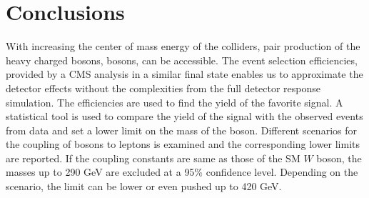 \section{Conclusions}\label{sec:conclusion} 
With increasing the center of mass energy of the colliders, pair production of the heavy charged bosons, \wprime bosons, can be accessible. The event selection efficiencies, provided by a CMS analysis in a similar final state enables us to approximate the detector effects without the complexities from the full detector response simulation. The efficiencies are used to find the yield of the favorite signal. A statistical tool is used to compare the yield of the signal with the observed events from data and set a lower limit on the mass of the \wprime boson. Different 
scenarios for the coupling of \wprime bosons to leptons is examined and the corresponding lower limits are reported. If the coupling constants are same as those of the SM $W$ boson, the masses up to 290 GeV are excluded at a 95\% confidence level. Depending on the scenario, the limit can be lower or even pushed up to 420 GeV.